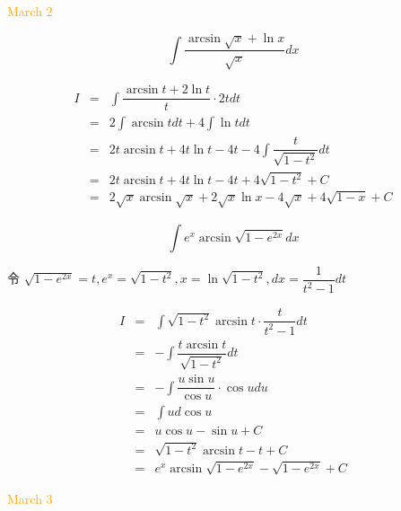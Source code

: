 \textcolor{orange}{March 2}

\begin{example}[][Exam: 29.1.3]
	$$\int\dfrac{\arcsin\sqrt{x}+\ln x}{\sqrt{x}}dx$$
\end{example}
\begin{solution}
	\begin{eqnarray*}
		I & = & \int \dfrac{\arcsin t + 2\ln t}{t} \cdot 2tdt\\
		  & = & 2\int \arcsin tdt + 4\int \ln tdt\\
		  & = & 2t\arcsin t + 4t\ln t -4t - 4\int \dfrac{t}{\sqrt{1-t^{2}}}dt\\
		  & = & 2t\arcsin t + 4t\ln t -4t + 4 \sqrt{1-t^{2}} + C\\
		  & = & 2 \sqrt{x}\arcsin\sqrt{x} + 2\sqrt{x} \ln x - 4 \sqrt{x} + 4\sqrt{1-x} + C 
	\end{eqnarray*}
\end{solution}

\begin{example}[][Exam: 29.1.4]
	$$\int e^{x}\arcsin\sqrt{1-e^{2x}}dx$$
\end{example}
\begin{solution}
	令 $\sqrt{1-e^{2x}} = t, e^{x} = \sqrt{1-t^{2}}, x = \ln \sqrt{1-t^{2}}, dx = \dfrac{1}{t^{2}-1}dt$

	\begin{eqnarray*}
		I & = & \int \sqrt{1-t^{2}}\arcsin t \cdot \dfrac{t}{t^{2}-1}dt \\
		  & = & -\int \dfrac{t\arcsin t}{\sqrt{1-t^{2}}}dt\\
		  & = & -\int \dfrac{u\sin u}{\cos u}\cdot \cos u du\\
		  & = & \int u d\cos u\\
		  & = & u\cos u - \sin u + C\\
		  & = & \sqrt{1-t^{2}}\arcsin t - t + C\\
		  & = & e^{x}\arcsin\sqrt{1-e^{2x}} - \sqrt{1-e^{2x}} + C
	\end{eqnarray*}
\end{solution}

\textcolor{orange}{March 3}

